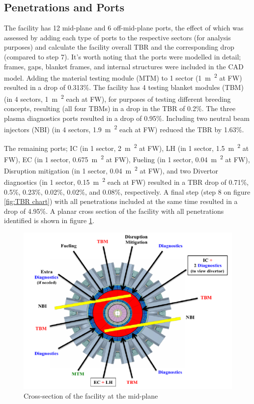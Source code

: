 \documentclass[12pt, letterpaper]{elsarticle}
\begin{document}
\subsection{Penetrations and Ports} \label{Penetrations and Ports}
The facility has 12 mid-plane and 6 off-mid-plane ports, the effect of which was assessed by adding each type of ports to the respective sectors (for analysis purposes) and calculate the facility overall TBR and the corresponding drop (compared to step 7). It's worth noting that the ports were modelled in detail; frames, gaps, blanket frames, and internal structures were included in the CAD model. Adding the material testing module (MTM) to 1 sector (\SI{1}{m\textsuperscript{2}} at FW) resulted in a drop of 0.313\%. The facility has 4 testing blanket modules (TBM) (in 4 sectors, \SI{1}{m\textsuperscript{2}} each at FW), for purposes of testing different breeding concepts, resulting (all four TBMs) in a drop in the TBR of 0.2\%. The three plasma diagnostics ports resulted in a drop of 0.95\%. Including two neutral beam injectors (NBI) (in 4 sectors, \SI{1.9}{m\textsuperscript{2}} each at FW) reduced the TBR by 1.63\%. \vspace{5mm}

The remaining ports; IC (in 1 sector, \SI{2}{m\textsuperscript{2}} at FW), LH (in 1 sector, \SI{1.5}{m\textsuperscript{2}} at FW), EC (in 1 sector, \SI{0.675}{m\textsuperscript{2}} at FW), Fueling (in 1 sector, \SI{0.04}{m\textsuperscript{2}} at FW), Disruption mitigation (in 1 sector, \SI{0.04}{m\textsuperscript{2}} at FW), and two Divertor diagnostics (in 1 sector, \SI{0.15}{m\textsuperscript{2}} each at FW) resulted in a TBR drop of 0.71\%, 0.5\%, 0.23\%, 0.02\%, 0.02\%, and 0.08\%, respectively. A final step (step 8 on figure \ref{fig:TBR chart}) with all penetrations included at the same time resulted in a drop of 4.95\%. A planar cross section of the facility with all penetrations identified is shown in figure \ref{fig:Ports}.
\begin{figure}[h!]
  \centering
  \includegraphics[scale=0.3]{../plots/ports.png}
  \caption{Cross-section of the facility at the mid-plane}
  \label{fig:Ports}
\end{figure}
\end{document}
